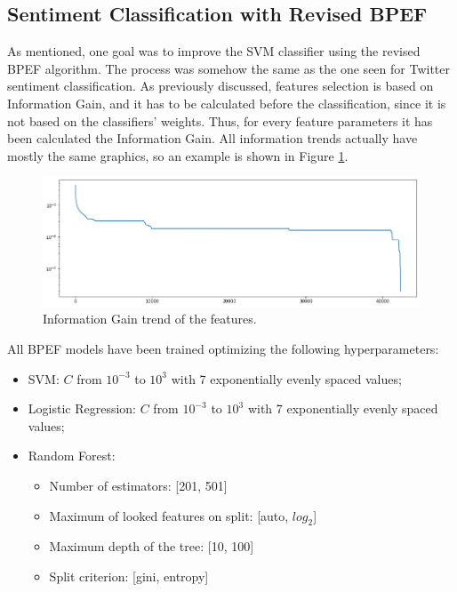 \subsection{Sentiment Classification with Revised BPEF}

As mentioned, one goal was to improve the SVM classifier using the revised BPEF algorithm. The process was somehow the same as the one seen for Twitter sentiment classification. As previously discussed, features selection is based on Information Gain, and it has to be calculated before the classification, since it is not based on the classifiers' weights. Thus, for every feature parameters it has been calculated the Information Gain. All information trends actually have mostly the same graphics, so an example is shown in Figure \ref{fig:ita_bpef_fs_1}.

\begin{figure}[H]
	\centering
	\includegraphics[width=\textwidth]{figures/conf_matrices/ita_snt_bpef/bpef_fs_1.png}
	\caption{Information Gain trend of the features.}
	\label{fig:ita_bpef_fs_1}
\end{figure}

All BPEF models have been trained optimizing the following hyperparameters:
\begin{itemize}
	\item SVM: $C$ from $10^{-3}$ to $10^3$ with 7 exponentially evenly spaced values;
	\item Logistic Regression: $C$ from $10^{-3}$ to $10^3$ with 7 exponentially evenly spaced values;
	\item Random Forest: 
	\begin{itemize}
		\item Number of estimators: [201, 501]
		\item Maximum of looked features on split: [auto, $log_2$]
		\item Maximum depth of the tree: [10, 100]
		\item Split criterion: [gini, entropy]
	\end{itemize}
\end{itemize}

